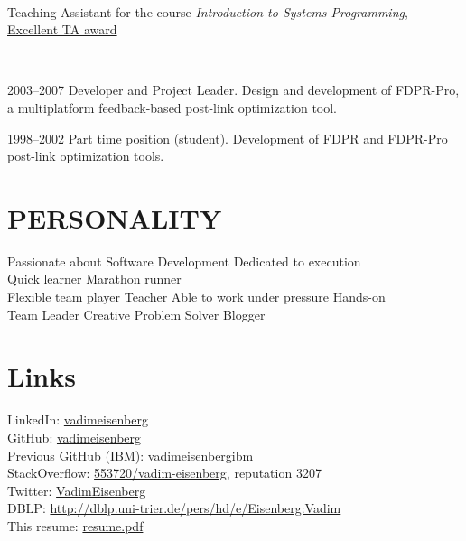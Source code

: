 \documentclass[]{deedy-resume}
\begin{document}
\begin{minipage}[t]{0.66\textwidth}
 \\
\vspace{\topsep} %
Teaching Assistant for the course \textit{Introduction to Systems Programming}, \href{http://www.cs.technion.ac.il/news/2010/384/}{Excellent TA award}
\sectionsep

 \\
\vspace{\topsep} %
\begin{tightemize}
\item 2003--2007 Developer and Project Leader. Design and development of FDPR-Pro, a multiplatform feedback-based post-link optimization tool.
\item  1998--2002 Part time position (student). Development of FDPR and FDPR-Pro post-link optimization tools.
\end{tightemize}
\sectionsep


\section{PERSONALITY}
Passionate about Software Development \textbullet{} Dedicated to execution\\
Quick learner \textbullet{} Marathon runner\\
Flexible team player \textbullet{} Teacher \textbullet{}  Able to work under pressure \textbullet{} Hands-on\\
Team Leader \textbullet{} Creative Problem Solver \textbullet{} Blogger

\section{Links}
LinkedIn:  \href{https://www.linkedin.com/in/vadimeisenberg}{vadimeisenberg} \\
GitHub: \href{https://github.com/vadimeisenberg}{vadimeisenberg} \\
Previous GitHub (IBM): \href{https://github.com/vadimeisenbergibm}{vadimeisenbergibm} \\
StackOverflow: \href{http://stackoverflow.com/users/553720/vadim-eisenberg}{553720/vadim-eisenberg}, reputation 3207 \\
Twitter: \href{https://twitter.com/VadimEisenberg}{VadimEisenberg} \\
DBLP: \href{http://dblp.uni-trier.de/pers/hd/e/Eisenberg:Vadim}{http://dblp.uni-trier.de/pers/hd/e/Eisenberg:Vadim} \\
This resume: \href{https://github.com/VadimEisenberg/resume/raw/gh-pages/resume.pdf}{resume.pdf}


\end{minipage}
\end{document}
